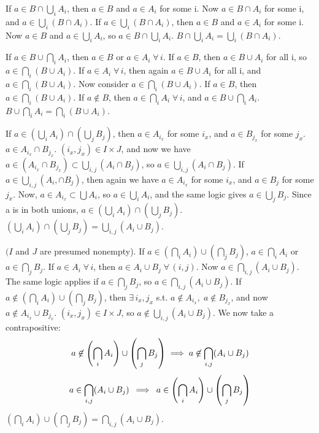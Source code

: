 \documentclass{article}
\DeclarePairedDelimiter\prn{(}{)}
\newcommand{\nl}[0]{\newline}
\newcommand{\rimp}[1][5]{\kern#1px \Longrightarrow \kern#1px}
\begin{document}
\begin{flushleft}
 \nl


 \nl
If $a \in B \cap \bigcup_i A_i$, then $a \in B$ and $a \in A_i$ for some i. Now $a \in B \cap A_i$ for some i, and $a \in \bigcup_i (B \cap A_i)$. \nl \nl
If $a \in \bigcup_i (B \cap A_i)$, then $a \in B$ and $a \in A_i$ for some i. Now $a \in B$ and $a \in \bigcup_i A_i$, so $a \in B \cap \bigcup_i A_i$. \nl \nl
$B \cap \bigcup_i A_i = \bigcup_i (B \cap A_i)$. \nl

 \nl
If $a \in B \cup \bigcap_i A_i$, then $a \in B$ or $a \in A_i \; \forall \, i$. If $a \in B$, then $a \in B \cup A_i$ for all i, so $a \in \bigcap_i (B \cup A_i)$. If $a \in A_i \; \forall \, i$, then again $a \in B \cup A_i$ for all i, and $a \in \bigcap_i (B \cup A_i)$. \nl \nl
Now consider $a \in \bigcap_i (B \cup A_i)$. If $a \in B$, then $a \in \bigcap_i (B \cup A_i)$. If $a \not\in B$, then $a \in \bigcap_i A_i \; \forall \, i$, and $a \in B \cup \bigcap_i A_i$. \nl \nl
$B \cup \bigcap_i A_i = \bigcap_i (B \cup A_i)$. \nl

 \nl
If $a \in (\bigcup_i A_i) \cap (\bigcup_j B_j)$, then $a \in A_{i_x}$ for some $i_x$, and $a \in B_{j_x}$ for some $j_x$. $a \in A_{i_x} \cap B_{j_x}$. $(i_x, j_x) \in I \times J$, and now we have $a \in (A_{i_x} \cap B_{j_x}) \subset \bigcup_{i,j} (A_i \cap B_j)$, so $a \in \bigcup_{i,j} (A_i \cap B_j)$. \nl \nl
If $a \in \bigcup_{i,j} (A_i, \cap B_j)$, then again we have $a \in A_{i_x}$ for some $i_x$, and $a \in B_j$ for some $j_x$. Now, $a \in A_{i_x} \subset \bigcup A_i$, so $a \in \bigcup_i A_i$, and the same logic gives $a \in \bigcup_j B_j$. Since a is in both unions, $a \in (\bigcup_i A_i) \cap (\bigcup_j B_j)$. \nl \nl
$(\bigcup_i A_i) \cap (\bigcup_j B_j) = \bigcup_{i,j} (A_i \cup B_j)$. \nl

 \nl
$(I$ and $J$ are presumed nonempty). \nl
If $a \in (\bigcap_i A_i) \cup (\bigcap_j B_j)$, $a \in \bigcap_i A_i$ or $a \in \bigcap_j B_j$. If $a \in A_i \; \forall \, i$, then $a \in A_i \cup B_j \; \forall \, (i,j)$. Now $a \in \bigcap_{i,j} (A_i \cup B_j)$. The same logic applies if $a \in \bigcap_j B_j$, so $a \in \bigcap_{i,j} (A_i \cup B_j)$. \nl \nl
If $a \not\in (\bigcap_i A_i) \cup (\bigcap_j B_j)$, then $\exists \, i_x, j_x$ s.t. $a \not\in A_{i_x}, \; a \not\in B_{j_x}$, and now $a \not\in A_{i_x} \cup B_{j_x}$. $(i_x, j_x) \in I \times J$, so $a \not\in \bigcup_{i,j} (A_i \cup B_j)$. We now take a contrapositive:
$$a \not\in \prn*{\bigcap_i A_i} \cup \prn*{\bigcap_j B_j} \implies a\not\in \bigcap_{i,j} (A_i \cup B_j)$$
$$a \in \bigcap_{i,j} (A_i \cup B_j) \rimp a \in \prn*{\bigcap_i A_i} \cup \prn*{\bigcap_j B_j}$$
$(\bigcap_i A_i) \cup (\bigcap_j B_j) = \bigcap_{i,j} (A_i \cup B_j)$. \nl


\end{flushleft}
\end{document}
